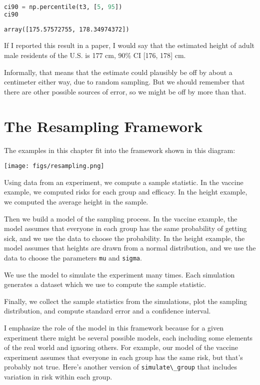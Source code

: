 \begin{lstlisting}[language=Python,style=source]
ci90 = np.percentile(t3, [5, 95])
ci90
\end{lstlisting}

\begin{lstlisting}[style=output]
array([175.57572755, 178.34974372])
\end{lstlisting}

If I reported this result in a paper, I would say that the estimated
height of adult male residents of the U.S. is 177 cm, 90\% CI {[}176,
178{]} cm.

Informally, that means that the estimate could plausibly be off by about
a centimeter either way, due to random sampling. But we should remember
that there are other possible sources of error, so we might be off by
more than that.

\section{The Resampling Framework}\label{the-resampling-framework}

The examples in this chapter fit into the framework shown in this
diagram:

\texttt{[image: figs/resampling.png]}

Using data from an experiment, we compute a sample statistic. In the
vaccine example, we computed risks for each group and efficacy. In the
height example, we computed the average height in the sample.

Then we build a model of the sampling process. In the vaccine example,
the model assumes that everyone in each group has the same probability
of getting sick, and we use the data to choose the probability. In the
height example, the model assumes that heights are drawn from a normal
distribution, and we use the data to choose the parameters
\passthrough{\lstinline!mu!} and \passthrough{\lstinline!sigma!}.

We use the model to simulate the experiment many times. Each simulation
generates a dataset which we use to compute the sample statistic.

Finally, we collect the sample statistics from the simulations, plot the
sampling distribution, and compute standard error and a confidence
interval.

I emphasize the role of the model in this framework because for a given
experiment there might be several possible models, each including some
elements of the real world and ignoring others. For example, our model
of the vaccine experiment assumes that everyone in each group has the
same risk, but that's probably not true. Here's another version of
\passthrough{\lstinline!simulate\_group!} that includes variation in
risk within each group.

